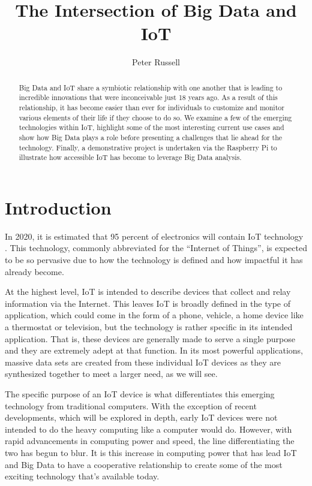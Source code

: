 \documentclass[sigconf]{acmart}
\begin{document}
\title{The Intersection of Big Data and IoT}

\author{Peter Russell}

\begin{abstract}

Big Data and IoT share a symbiotic relationship with one another that is leading to incredible innovations that were inconceivable just 18 years ago. As a result of this relationship, it has become easier than ever for individuals to customize and monitor various elements of their life if they choose to do so. We examine a few of the emerging technologies within IoT, highlight some of the most interesting current use cases and show how Big Data plays a role before presenting a challenges that lie ahead for the technology. Finally, a demonstrative project is undertaken via the Raspberry Pi to illustrate how accessible IoT has become to leverage Big Data analysis.
\end{abstract}


\maketitle

\section{Introduction}
In 2020, it is estimated that 95 percent of electronics will contain IoT technology \cite{gartner95}. This technology, commonly abbreviated for the ``Internet of Things'', is expected to be so pervasive due to how the technology is defined and how impactful it has already become. 

At the highest level, IoT is intended to describe devices that collect and relay information via the Internet. This leaves IoT is broadly defined in the type of application, which could come in the form of a phone, vehicle, a home device like a thermostat or television, but the technology is rather specific in its intended application. That is, these devices are generally made to serve a single purpose and they are extremely adept at that function. In its most powerful applications, massive data sets are created from these individual IoT devices as they are synthesized together to meet a larger need, as we will see.  

The specific purpose of an IoT device is what differentiates this emerging technology from traditional computers. With the exception of recent developments, which will be explored in depth, early IoT devices were not intended to do the heavy computing like a computer would do. However, with rapid advancements in computing power and speed, the line differentiating the two has begun to blur. It is this increase in computing power that has lead IoT and Big Data to have a cooperative relationship to create some of the most exciting technology that's available today. 
\end{document}
